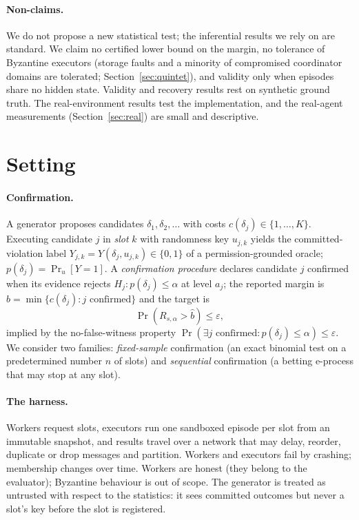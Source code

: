 \documentclass[11pt]{article}
\theoremstyle{definition}
\newcommand{\bhat}{\hat b}
\begin{document}
\paragraph{Non-claims.} We do not propose a new statistical test; the inferential results we rely on are standard. We claim no certified lower bound on the margin, no tolerance of Byzantine executors (storage faults and a minority of compromised coordinator domains are tolerated; Section~\ref{sec:quintet}), and validity only when episodes share no hidden state. Validity and recovery results rest on synthetic ground truth. The real-environment results test the implementation, and the real-agent measurements (Section~\ref{sec:real}) are small and descriptive.

\section{Setting}\label{sec:setting}

\paragraph{Confirmation.} A generator proposes candidates $\delta_1,\delta_2,\dots$ with costs $c(\delta_j)\in\{1,\dots,K\}$. Executing candidate $j$ in \emph{slot} $k$ with randomness key $u_{j,k}$ yields the committed-violation label $Y_{j,k}=Y(\delta_j,u_{j,k})\in\{0,1\}$ of a permission-grounded oracle; $p(\delta_j)=\Pr_u[Y=1]$. A \emph{confirmation procedure} declares candidate $j$ confirmed when its evidence rejects $H_j:p(\delta_j)\le\alpha$ at level $a_j$; the reported margin is $\bhat=\min\{c(\delta_j):j\text{ confirmed}\}$ and the target is
\begin{equation}
\Pr(R_{s,\alpha}>\bhat)\le\varepsilon,\label{eq:G1}
\end{equation}
implied by the no-false-witness property $\Pr(\exists j\text{ confirmed}:p(\delta_j)\le\alpha)\le\varepsilon$. We consider two families: \emph{fixed-sample} confirmation (an exact binomial test on a predetermined number $n$ of slots) and \emph{sequential} confirmation (a betting e-process that may stop at any slot).

\paragraph{The harness.} Workers request slots, executors run one sandboxed episode per slot from an immutable snapshot, and results travel over a network that may delay, reorder, duplicate or drop messages and partition. Workers and executors fail by crashing; membership changes over time. Workers are honest (they belong to the evaluator); Byzantine behaviour is out of scope. The generator is treated as untrusted with respect to the statistics: it sees committed outcomes but never a slot's key before the slot is registered.
\end{document}
